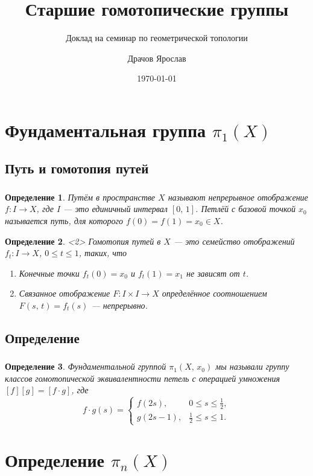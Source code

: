 \documentclass[c]{beamer}
\title{Старшие гомотопические группы}
\subtitle{Доклад на семинар по геометрической топологии}
\author{Драчов Ярослав}
\date{\today}
\institute[МФТИ]{Московский физико-технический институт}
\newtheorem{rdfn}{Определение}
\begin{document}
\frame[plain]{\titlepage}

\section{Фундаментальная группа $\pi_1(X)$}
\subsection{Путь и гомотопия путей}

\begin{frame}
\frametitle{\insertsection}
\framesubtitle{\insertsubsection}
\begin{rdfn}
	\emph{Путём} в пространстве $X$ называют непрерывное отображение
	$f\colon I\to X $, где $I$ --- это единичный интервал
	$[0,\,1]$. \emph{Петлёй} с \emph{базовой точкой} $x_0$
	называется путь, для которого
	$f(0)=f(1)=x_0 \in X$.
\end{rdfn}

\begin{rdfn}<2>
	\emph{Гомотопия путей} в $X$ --- это семейство отображений
	$f_t \colon I \to X$, $0 \le t \le 1$, таких, что
	\begin{enumerate}
		\item Конечные точки $f_t(0)=x_0$ и $f_t(1)=x_1$
		не зависят от $t$.
		 \item Связанное отображение $F \colon I\times
			 I\to X$ определённое соотношением
			 $F(s,\,t)=f_t (s)$ --- непрерывно.
	\end{enumerate}
\end{rdfn}
\end{frame}
\subsection{Определение}
\begin{frame}
\frametitle{\insertsection}
\framesubtitle{\insertsubsection}
	\begin{rdfn}
	\emph{Фундаментальной группой $\pi_1 (X,\,x_0)$} мы называли
	группу классов гомотопической эквивалентности петель с операцией умножения
	$[f][g]=[f\cdot g]$, где 
	 \[
		 f \cdot g (s)= \begin{cases}
		f(2s), & 0\le  s\le \frac{1}{2},\\
		g(2s-1), & \frac{1}{2}\le  s \le  1.
	\end{cases}
	\] 
\end{rdfn}
\end{frame}
\section{Определение $\pi_n(X)$}
\end{document}
